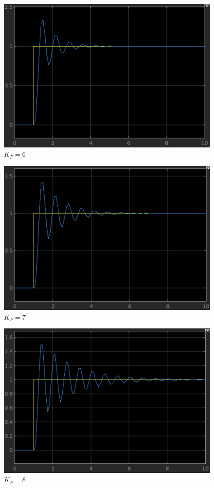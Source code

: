 \documentclass{article}
\begin{document}
\newpage
				\begin{figure}[h]
					\includegraphics[scale=0.225, center]{2_c_KP_6.png}
					\caption{$K_P = 6$}
					\label{fig21: Graph_c_KP_6}
				\end{figure}			
				\begin{figure}[h]
					\includegraphics[scale=0.225, center]{2_c_KP_7.png}
					\caption{$K_P = 7$}
					\label{fig22: Graph_c_KP_7}
				\end{figure}		
\newpage
				\begin{figure}[h]
					\includegraphics[scale=0.225, center]{2_c_KP_8.png}
					\caption{$K_P = 8$}
					\label{fig23: Graph_c_KP_8}
				\end{figure}				
\end{document}

